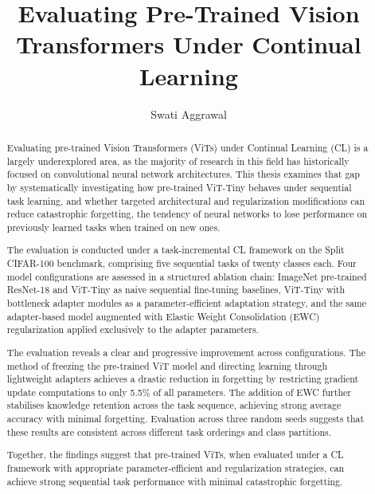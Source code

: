\documentclass[english, LaM, oneside]{sapthesis}%
\title{Evaluating Pre-Trained Vision Transformers Under Continual Learning}
\author{Swati Aggrawal}
\numberwithin{equation}{chapter}
\begin{document}
\frontmatter
\maketitle




\begin{abstract}
Evaluating pre-trained Vision Transformers (ViTs) under Continual Learning (CL) is a largely underexplored area, as the majority of research in this field has historically focused on convolutional neural network architectures. This thesis examines that gap by systematically investigating how pre-trained ViT-Tiny behaves under sequential task learning, and whether targeted architectural and regularization modifications can reduce catastrophic forgetting, the tendency of neural networks to lose performance on previously learned tasks when trained on new ones.

The evaluation is conducted under a task-incremental CL framework on the Split CIFAR-100 benchmark, comprising five sequential tasks of twenty classes each. Four model configurations are assessed in a structured ablation chain: ImageNet pre-trained ResNet-18 and ViT-Tiny as naive sequential fine-tuning baselines, ViT-Tiny with bottleneck adapter modules as a parameter-efficient adaptation strategy, and the same adapter-based model augmented with Elastic Weight Consolidation (EWC) regularization applied exclusively to the adapter parameters.

The evaluation reveals a clear and progressive improvement across configurations. The method of freezing the pre-trained ViT model and directing learning through lightweight adapters achieves a drastic reduction in forgetting by restricting gradient update computations to only 5.5\% of all parameters. The addition of EWC further stabilises knowledge retention across the task sequence, achieving strong average accuracy with minimal forgetting. Evaluation across three random seeds suggests that these results are consistent across different task orderings and class partitions.

Together, the findings suggest that pre-trained ViTs, when evaluated under a CL framework with appropriate parameter-efficient and regularization strategies, can achieve strong sequential task performance with minimal catastrophic forgetting.
\end{abstract}
\end{document}
